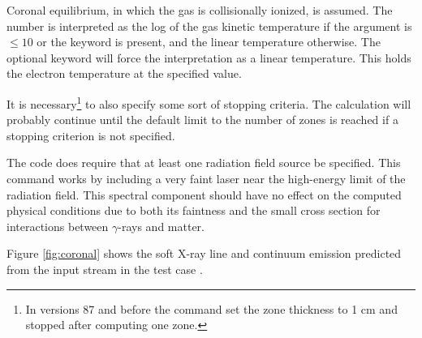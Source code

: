 Coronal equilibrium, in which the gas is collisionally ionized, is
assumed.
The number is interpreted as the log of the
gas kinetic temperature if the
argument is $\le 10$ or the keyword  is present, and the linear temperature otherwise.
The optional keyword
 will force the interpretation as a linear temperature.  This holds
the electron temperature at the specified value.

It is necessary\footnote{In versions 87 and before
the  command set the zone thickness
to 1 cm and stopped after computing one zone.}
to also specify some sort of stopping criteria.
The calculation will probably continue until the default
limit to the number
of zones is reached if a stopping criterion is not specified.

The code does require that at least one radiation field source be specified.
This command works by including a very faint laser
near the high-energy limit of the radiation field.
This spectral component should have no effect on the computed physical conditions
due to both its faintness and the small cross section for interactions between
$\gamma$-rays and matter.

Figure \ref{fig:coronal} shows the soft X-ray line and
continuum emission predicted
from the input stream in the test case .

